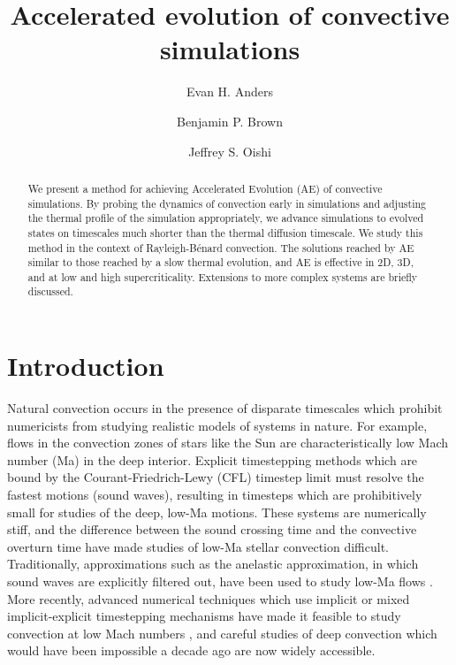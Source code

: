 \documentclass[aps, pre, onecolumn, nofootinbib, notitlepage, groupedaddress, amsfonts, amssymb, amsmath, longbibliography]{revtex4-1}
\newcommand{\RB}{Rayleigh-B\'{e}nard }
\begin{document}
\author{Evan H. Anders}
\author{Benjamin P. Brown}
\author{Jeffrey S. Oishi}
\title{Accelerated evolution of convective simulations}

\begin{abstract}
We present a method for achieving Accelerated Evolution (AE) of convective simulations.
By probing the dynamics of convection early in simulations and adjusting the
thermal profile of the simulation appropriately, we advance simulations to
evolved states on timescales much shorter than the thermal diffusion timescale.
We study this method in the context of \RB convection. 
The solutions reached by AE similar to those reached by a slow thermal evolution, 
and AE is effective in 2D, 3D, and at low and high supercriticality.  
Extensions to more complex systems are briefly discussed.
\end{abstract}
\maketitle


\section{Introduction}
\label{sec:intro}
Natural convection occurs in the presence of disparate timescales which
prohibit numericists from studying realistic models of systems in nature.  For example,
flows in the convection zones of stars like the Sun are characteristically low Mach number
(Ma) in the deep interior.
Explicit timestepping methods which are bound by the Courant-Friedrich-Lewy
(CFL) timestep limit must resolve the fastest motions (sound
waves), resulting in timesteps which are prohibitively
small for studies of the deep, low-Ma motions. These systems are numerically
stiff, and the difference between
the sound crossing time and the convective overturn time have made studies of low-Ma stellar
convection difficult. Traditionally, approximations such as
the anelastic approximation, in which sound waves are explicitly filtered out,
have been used to study low-Ma flows \cite{brown&all2010, featherstone&hindman2016}.
More recently, advanced numerical techniques which use implicit or mixed
implicit-explicit timestepping mechanisms have made it feasible to study
convection at low Mach numbers \cite{viallet&all2011, viallet&all2013, viallet&all2016, lecoanet&all2014,
anders&brown2017, bordwell&all2018}, and careful studies of deep convection which
would have been impossible a decade ago are now widely accessible.
\end{document}
